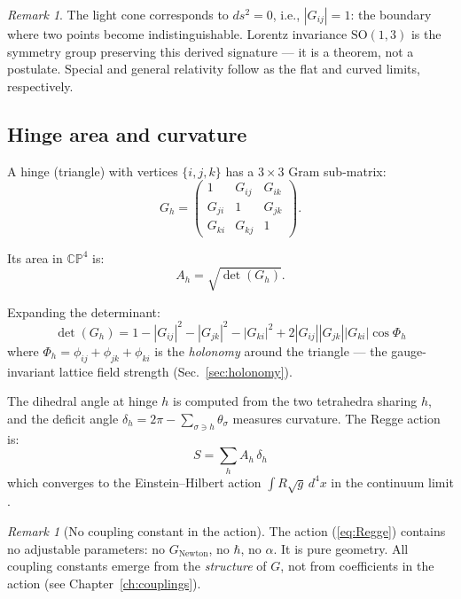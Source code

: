 \documentclass[12pt]{article}
\theoremstyle{remark}
\newtheorem{remark}[theorem]{Remark}
\theoremstyle{definition}
\begin{document}
\begin{remark}
The light cone corresponds to $ds^2 = 0$, i.e., $|G_{ij}| = 1$: the boundary where two points become indistinguishable. Lorentz invariance $\text{SO}(1,3)$ is the symmetry group preserving this derived signature --- it is a theorem, not a postulate. Special and general relativity follow as the flat and curved limits, respectively.
\end{remark}

\subsection{Hinge area and curvature}

A hinge (triangle) with vertices $\{i, j, k\}$ has a $3\times 3$ Gram sub-matrix:
\begin{equation}
G_h = \begin{pmatrix} 1 & G_{ij} & G_{ik} \\ G_{ji} & 1 & G_{jk} \\ G_{ki} & G_{kj} & 1 \end{pmatrix}.
\end{equation}

Its area in $\mathbb{CP}^4$ is:
\begin{equation}
A_h = \sqrt{\det(G_h)}.
\end{equation}

Expanding the determinant:
\begin{equation}
\det(G_h) = 1 - |G_{ij}|^2 - |G_{jk}|^2 - |G_{ki}|^2 + 2|G_{ij}||G_{jk}||G_{ki}|\cos\Phi_h
\label{eq:detGh}
\end{equation}
where $\Phi_h = \phi_{ij} + \phi_{jk} + \phi_{ki}$ is the \emph{holonomy} around the triangle --- the gauge-invariant lattice field strength (Sec.~\ref{sec:holonomy}).

The dihedral angle at hinge $h$ is computed from the two tetrahedra sharing $h$, and the deficit angle $\delta_h = 2\pi - \sum_{\sigma \ni h} \theta_\sigma$ measures curvature. The Regge action is:
\begin{equation}
\boxed{S = \sum_h A_h\,\delta_h}
\label{eq:Regge}
\end{equation}
which converges to the Einstein--Hilbert action $\int R\sqrt{g}\,d^4x$ in the continuum limit \cite{Regge}.

\begin{remark}[No coupling constant in the action]
The action (\ref{eq:Regge}) contains no adjustable parameters: no $G_\text{Newton}$, no $\hbar$, no $\alpha$. It is pure geometry. All coupling constants emerge from the \emph{structure} of $G$, not from coefficients in the action (see Chapter~\ref{ch:couplings}).
\end{remark}
\end{document}
